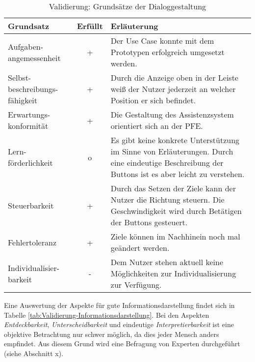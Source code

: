\begin{table}
\centering
\begin{tabular}{p{}|c|p{}}
\textbf{Grundsatz} & \textbf{Erfüllt} & \textbf{Erläuterung} \\
\hline
Aufgaben-angemessenheit & + & Der Use Case konnte mit dem Prototypen erfolgreich umgesetzt werden. \\
\hline
Selbst-beschreibungs-fähigkeit & + & Durch die Anzeige oben in der Leiste weiß der Nutzer jederzeit an welcher Position er sich befindet. \\
\hline
Erwartungs-konformität & + & Die Gestaltung des Assistenzsystem orientiert sich an der PFE.\\
\hline
Lern-förderlichkeit & o & Es gibt keine konkrete Unterstützung im Sinne von Erläuterungen. Durch eine eindeutige Beschreibung der Buttons ist es aber leicht zu verstehen. \\
\hline
Steuerbarkeit & + & Durch das Setzen der Ziele kann der Nutzer die Richtung steuern. Die Geschwindigkeit wird durch Betätigen der Buttons gesteuert. \\
\hline
Fehlertoleranz & + & Ziele können im Nachhinein noch mal geändert werden. \\
\hline
Individualisier-barkeit & - & Dem Nutzer stehen aktuell keine Möglichkeiten zur Individualisierung zur Verfügung. \\
\end{tabular}
\caption{Validierung: Grundsätze der Dialoggestaltung}
\label{tab:Validierung-Dialoggestaltung}
\end{table}

Eine Auswertung der Aspekte für gute Informationsdarstellung findet sich in Tabelle \ref{tab:Validierung-Informationsdarstellung}. Bei den Aspekten \textit{Entdeckbarkeit}, \textit{Unterscheidbarkeit} und eindeutige \textit{Interpretierbarkeit} ist eine objektive Betrachtung nur schwer möglich, da dies jeder Mensch anders empfindet. Aus diesem Grund wird eine Befragung von Experten durchgeführt (siehe Abschnitt x).

